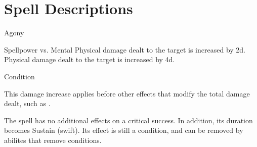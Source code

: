 \section{Spell Descriptions}
\begin{spellsection}{Agony}
\begin{spellheader}
\end{spellheader}
\begin{spellcontent}
\begin{spelltargetinginfo}
\end{spelltargetinginfo}
\begin{spelleffects}
\begin{spellattack}{Spellpower vs. Mental}
\spellsuccess Physical damage dealt to the target is increased by \plus2d.
\spellcritical Physical damage dealt to the target is increased by \plus4d.
\end{spellattack}
\spelldur Condition
\end{spelleffects}
\end{spellcontent}
\begin{spellfooter}
\spellnotes This damage increase applies before other effects that modify the total damage dealt, such as .
\miscastexplode
\end{spellfooter}
\begin{spellcantrip}
The spell has no additional effects on a critical success.
In addition, its duration becomes Sustain (swift).
Its effect is still a condition, and can be removed by abilites that remove conditions.
\end{spellcantrip}
\end{spellsection}
